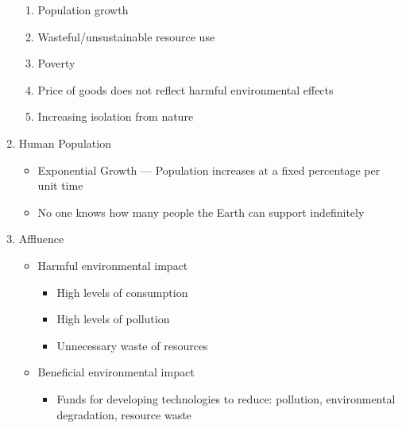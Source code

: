 \documentclass[12pt]{article}
\begin{document}
\begin{enumerate}
    \begin{enumerate}

      \item Population growth

      \item Wasteful/unsustainable resource use

      \item Poverty

      \item Price of goods does not reflect harmful environmental effects

      \item Increasing isolation from nature

    \end{enumerate}

  \item Human Population

    \begin{itemize}

      \item Exponential Growth — Population increases at a fixed percentage per unit time

      \item No one knows how many people the Earth can support indefinitely

    \end{itemize}

  \item Affluence

    \begin{itemize}

      \item Harmful environmental impact

        \begin{itemize}

          \item High levels of consumption

          \item High levels of pollution

          \item Unnecessary waste of resources

        \end{itemize}

      \item Beneficial environmental impact

        \begin{itemize}

          \item Funds for developing technologies to reduce: pollution, environmental degradation, resource waste


\end{itemize}
\end{itemize}
\end{enumerate}
\end{document}
